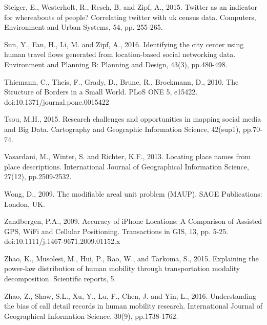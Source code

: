 \documentclass[]{tGIS2e}
\begin{document}
\begin{thebibliography}{9}
Steiger, E., Westerholt, R., Resch, B. and Zipf, A., 2015. Twitter as an indicator for whereabouts of people? Correlating twitter with uk census data. Computers, Environment and Urban Systems, 54, pp. 255-265.

Sun, Y., Fan, H., Li, M. and Zipf, A., 2016. Identifying the city center using human travel flows generated from location-based social networking data. Environment and Planning B: Planning and Design, 43(3), pp.480-498.

Thiemann, C., Theis, F., Grady, D., Brune, R., Brockmann, D., 2010. The Structure of Borders in a Small World. PLoS ONE 5, e15422. doi:10.1371/journal.pone.0015422

Tsou, M.H., 2015. Research challenges and opportunities in mapping social media and Big Data. Cartography and Geographic Information Science, 42(sup1), pp.70-74.

Vasardani, M., Winter, S. and Richter, K.F., 2013. Locating place names from place descriptions. International Journal of Geographical Information Science, 27(12), pp.2509-2532.

Wong, D., 2009. The modifiable areal unit problem (MAUP). SAGE Publications: London, UK.

Zandbergen, P.A., 2009. Accuracy of iPhone Locations: A Comparison of Assisted GPS, WiFi and Cellular Positioning. Transactions in GIS, 13, pp. 5-25. doi:10.1111/j.1467-9671.2009.01152.x

Zhao, K., Musolesi, M., Hui, P., Rao, W., and Tarkoma, S., 2015. Explaining the power-law distribution of human mobility through transportation modality decomposition. Scientific reports, 5.

Zhao, Z., Shaw, S.L., Xu, Y., Lu, F., Chen, J. and Yin, L., 2016. Understanding the bias of call detail records in human mobility research. International Journal of Geographical Information Science, 30(9), pp.1738-1762.


\end{thebibliography}
\end{document}

